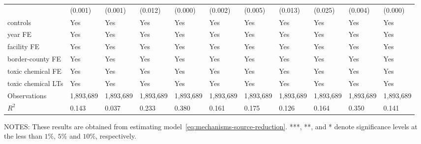 \begin{table}[H]
{\begin{tabular}{@{}lllllllllll@{}}
            & (0.001)       & (0.001)       & (0.012)        & (0.000)      & (0.002)        & (0.005)   & (0.013)                      & (0.025)          & (0.004)               & (0.000)          \\
            controls           & Yes           & Yes           & Yes            & Yes          & Yes            & Yes       & Yes                          & Yes              & Yes                   & Yes              \\
            year FE            & Yes           & Yes           & Yes            & Yes          & Yes            & Yes       & Yes                          & Yes              & Yes                   & Yes              \\
            facility FE        & Yes           & Yes           & Yes            & Yes          & Yes            & Yes       & Yes                          & Yes              & Yes                   & Yes              \\
            border-county FE   & Yes           & Yes           & Yes            & Yes          & Yes            & Yes       & Yes                          & Yes              & Yes                   & Yes              \\
            toxic chemical FE  & Yes           & Yes           & Yes            & Yes          & Yes            & Yes       & Yes                          & Yes              & Yes                   & Yes              \\
            toxic chemical LTs & Yes           & Yes           & Yes            & Yes          & Yes            & Yes       & Yes                          & Yes              & Yes                   & Yes              \\\midrule
            Observations       & 1,893,689     & 1,893,689     & 1,893,689      & 1,893,689    & 1,893,689      & 1,893,689 & 1,893,689                    & 1,893,689        & 1,893,689             & 1,893,689        \\
            $R^2$              & 0.143         & 0.037         & 0.233          & 0.380        & 0.161          & 0.175     & 0.126                        & 0.164            & 0.350                 & 0.141            \\ \bottomrule \bottomrule
        \end{tabular}%
    }
    \begin{minipage}{\columnwidth}
        \vspace{0.05in}
        \tiny NOTES: These results are obtained from estimating model~\ref{eq:mechanisms-source-reduction}. ***, **, and * denote significance levels at the less than $1\%$, $5\%$ and $10\%$, respectively.
    \end{minipage}
\end{table}